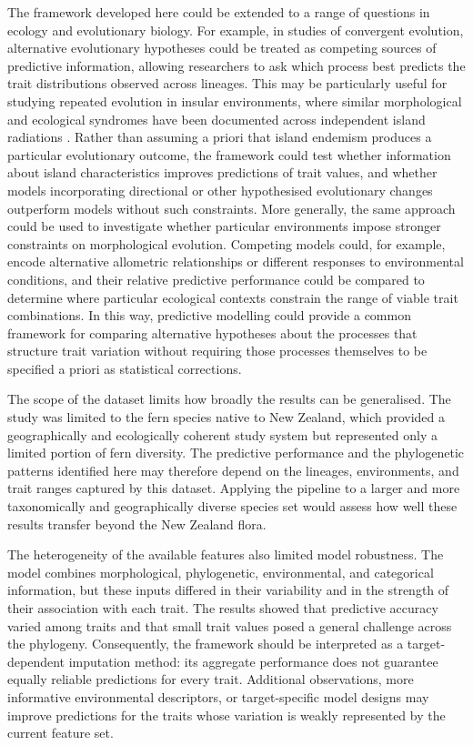 \documentclass[preprint,12pt,authoryear]{elsarticle}
\begin{document}
The framework developed here could be extended to a range of questions in ecology and evolutionary biology. For example, in studies of convergent evolution, alternative evolutionary hypotheses could be treated as competing sources of predictive information, allowing researchers to ask which process best predicts the trait distributions observed across lineages. This may be particularly useful for studying repeated evolution in insular environments, where similar morphological and ecological syndromes have been documented across independent island radiations \citep{ciarle2023island, whittaker2023island}. Rather than assuming a priori that island endemism produces a particular evolutionary outcome, the framework could test whether information about island characteristics improves predictions of trait values, and whether models incorporating directional or other hypothesised evolutionary changes outperform models without such constraints. More generally, the same approach could be used to investigate whether particular environments impose stronger constraints on morphological evolution. Competing models could, for example, encode alternative allometric relationships or different responses to environmental conditions, and their relative predictive performance could be compared to determine where particular ecological contexts constrain the range of viable trait combinations. In this way, predictive modelling could provide a common framework for comparing alternative hypotheses about the processes that structure trait variation without requiring those processes themselves to be specified a priori as statistical corrections.

The scope of the dataset limits how broadly the results can be generalised. The study was limited to the fern species native to New Zealand, which provided a geographically and ecologically coherent study system but represented only a limited portion of fern diversity. The predictive performance and the phylogenetic patterns identified here may therefore depend on the lineages, environments, and trait ranges captured by this dataset. Applying the pipeline to a larger and more taxonomically and geographically diverse species set would assess how well these results transfer beyond the New Zealand flora.

The heterogeneity of the available features also limited model robustness. The model combines morphological, phylogenetic, environmental, and categorical information, but these inputs differed in their variability and in the strength of their association with each trait. The results showed that predictive accuracy varied among traits and that small trait values posed a general challenge across the phylogeny. Consequently, the framework should be interpreted as a target-dependent imputation method: its aggregate performance does not guarantee equally reliable predictions for every trait. Additional observations, more informative environmental descriptors, or target-specific model designs may improve predictions for the traits whose variation is weakly represented by the current feature set.
\end{document}
